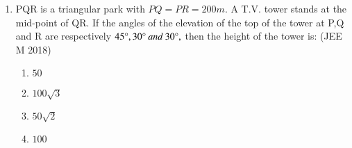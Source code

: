 \documentclass[journal,12pt,twocolumn]{IEEEtran}
\theoremstyle{remark}
\begin{document}
\begin{enumerate}[start =3]
\item PQR is a triangular park with $PQ=PR=200m$. A T.V. tower stands at the mid-point of QR. If the angles of the elevation of the top of the tower at P,Q and R are respectively $45\degree , 30\degree \: and \: 30\degree,$ then the height of the tower  is: \hfill{(JEE M 2018)}
\begin{multicols}{2}
\begin{enumerate}
        \item $50$                    
        \item $100\sqrt{3}$ 
        \item $50\sqrt{2}$ 
        \item $100$
\end{enumerate}
\end{multicols} 


\end{enumerate}
\end{document}
